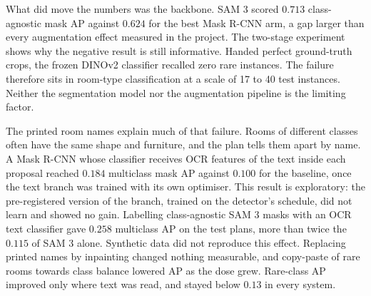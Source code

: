 What did move the numbers was the backbone. SAM 3 scored $0.713$ class-agnostic
mask AP against $0.624$ for the best Mask R-CNN arm, a gap larger than every
augmentation effect measured in the project. The two-stage experiment shows why
the negative result is still informative. Handed perfect ground-truth crops, the
frozen DINOv2 classifier recalled zero rare instances. The failure therefore
sits in room-type classification at a scale of 17 to 40 test instances. Neither
the segmentation model nor the augmentation pipeline is the limiting factor.

The printed room names explain much of that failure. Rooms of different classes
often have the same shape and furniture, and the plan tells them apart by name.
A Mask R-CNN whose classifier receives OCR features of the text inside each
proposal reached $0.184$ multiclass mask AP against $0.100$ for the baseline,
once the text branch was trained with its own optimiser. This result is
exploratory: the pre-registered version of the branch, trained on the detector's
schedule, did not learn and showed no gain. Labelling class-agnostic SAM 3 masks
with an OCR text classifier gave $0.258$ multiclass AP on the test plans,
more than twice the $0.115$ of SAM 3 alone. Synthetic data did not reproduce
this effect. Replacing printed names by inpainting changed nothing measurable,
and copy-paste of rare rooms towards class balance lowered AP as the dose
grew. Rare-class AP improved only where text was read, and stayed below $0.13$
in every system.
